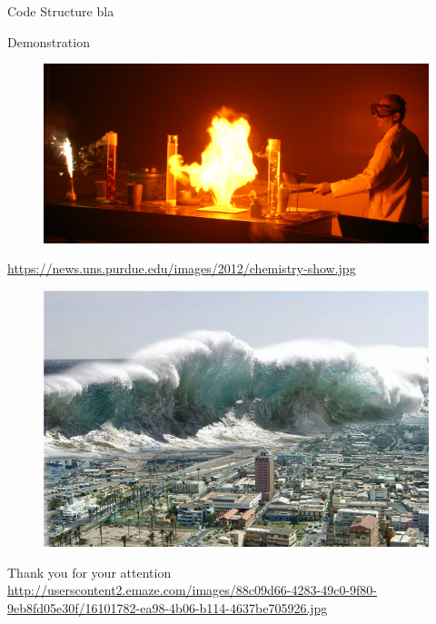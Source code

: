 \documentclass[shortpres,usenames,dvipsnames]{beamer}
\newcommand{\imgfullscale}{0.75}
\begin{document}
\begin{frame}[fragile]{Code Structure}
bla
\end{frame}

\begin{frame}[fragile]{Demonstration}
	\begin{figure}
		\includegraphics[clip, width=\linewidth]{img/demo.jpeg}
	\end{figure}
	
	\vfill
	\flushleft
	{\fontsize{5}{5} \selectfont \url{https://news.uns.purdue.edu/images/2012/chemistry-show.jpg}}
\end{frame}

\begin{frame}{}
	\begin{figure}
		\includegraphics[clip, width=\imgfullscale\linewidth]{img/tsunami.jpg}
	\end{figure}
	\centering
	\vspace{10pt}
	Thank you for your attention
	\\
	\vfill
	\flushleft
	{\fontsize{5}{5} \selectfont \url{http://userscontent2.emaze.com/images/88c09d66-4283-49c0-9f80-9eb8fd05e30f/16101782-ea98-4b06-b114-4637be705926.jpg}}
\end{frame}
\end{document}
